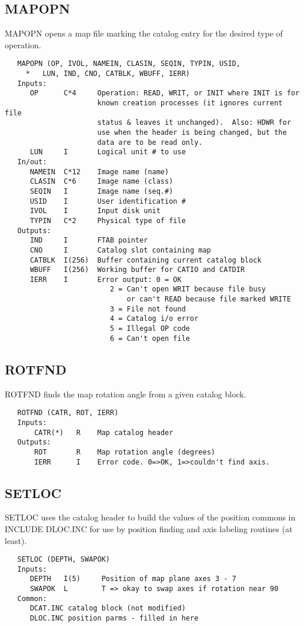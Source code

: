 \subsection{MAPOPN}
MAPOPN opens a map file marking the catalog entry for the desired
type of operation.
\begin{verbatim}
   MAPOPN (OP, IVOL, NAMEIN, CLASIN, SEQIN, TYPIN, USID,
     *   LUN, IND, CNO, CATBLK, WBUFF, IERR)
   Inputs:
      OP      C*4     Operation: READ, WRIT, or INIT where INIT is for
                      known creation processes (it ignores current file
                      status & leaves it unchanged).  Also: HDWR for
                      use when the header is being changed, but the
                      data are to be read only.
      LUN     I       Logical unit # to use
   In/out:
      NAMEIN  C*12    Image name (name)
      CLASIN  C*6     Image name (class)
      SEQIN   I       Image name (seq.#)
      USID    I       User identification #
      IVOL    I       Input disk unit
      TYPIN   C*2     Physical type of file
   Outputs:
      IND     I       FTAB pointer
      CNO     I       Catalog slot containing map
      CATBLK  I(256)  Buffer containing current catalog block
      WBUFF   I(256)  Working buffer for CATIO and CATDIR
      IERR    I       Error output: 0 = OK
                         2 = Can't open WRIT because file busy
                             or can't READ because file marked WRITE
                         3 = File not found
                         4 = Catalog i/o error
                         5 = Illegal OP code
                         6 = Can't open file
\end{verbatim}

\subsection{ROTFND}
ROTFND finds the map rotation angle from a given catalog block.
\begin{verbatim}
   ROTFND (CATR, ROT, IERR)
   Inputs:
       CATR(*)   R    Map catalog header
   Outputs:
       ROT       R    Map rotation angle (degrees)
       IERR      I    Error code. 0=>OK, 1=>couldn't find axis.
\end{verbatim}

\subsection{SETLOC}
SETLOC uses the catalog header to build the values of the position
commons in INCLUDE DLOC.INC for use by position finding and axis labeling
routines (at least).
\begin{verbatim}
   SETLOC (DEPTH, SWAPOK)
   Inputs:
      DEPTH   I(5)     Position of map plane axes 3 - 7
      SWAPOK  L        T => okay to swap axes if rotation near 90
   Common:
      DCAT.INC catalog block (not modified)
      DLOC.INC position parms - filled in here
\end{verbatim}

